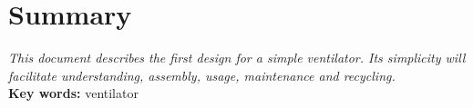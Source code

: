 \section*{Summary}
\textit{This document describes the first design for a simple ventilator. Its simplicity will facilitate understanding, assembly, usage, maintenance and recycling.}\\
\textbf{Key words:} ventilator